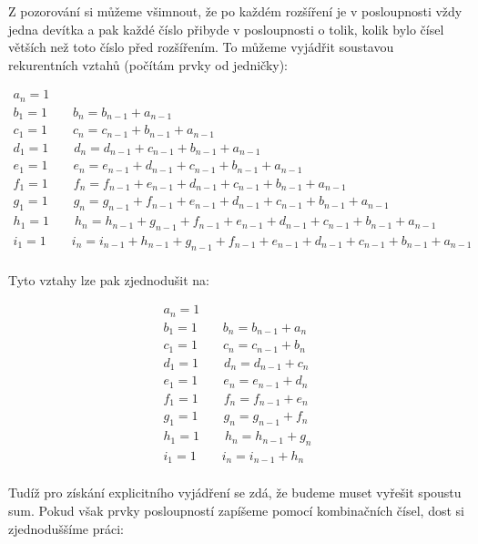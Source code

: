 \documentclass{fkssolpub}
\author{Ondřej Sedláček}
\begin{document}
 

Z pozorování si můžeme všimnout, že po každém rozšíření je v posloupnosti
vždy jedna devítka a pak každé číslo přibyde v posloupnosti o tolik,
kolik bylo čísel větších než toto číslo před rozšířením. To můžeme
vyjádřit soustavou rekurentních vztahů (počítám prvky od jedničky):

\begin{gather*}
  a_n = 1 \\
  b_1 = 1 \qquad b_n = b_{n - 1} + a_{n - 1} \\
  c_1 = 1 \qquad c_n = c_{n - 1} + b_{n - 1} + a_{n - 1} \\
  d_1 = 1 \qquad d_n = d_{n - 1} + c_{n - 1} + b_{n - 1} + a_{n - 1} \\
  e_1 = 1 \qquad e_n = e_{n - 1} + d_{n - 1} + c_{n - 1} + b_{n - 1} + a_{n - 1} \\
  f_1 = 1 \qquad f_n = f_{n - 1} + e_{n - 1} + d_{n - 1} + c_{n - 1} + b_{n - 1} + a_{n - 1} \\
  g_1 = 1 \qquad g_n = g_{n - 1} + f_{n - 1} + e_{n - 1} + d_{n - 1} + c_{n - 1} + b_{n - 1} + a_{n - 1} \\
  h_1 = 1 \qquad h_n = h_{n - 1} + g_{n - 1} + f_{n - 1} + e_{n - 1} + d_{n - 1} + c_{n - 1} + b_{n - 1} + a_{n - 1} \\
  i_1 = 1 \qquad i_n = i_{n - 1} + h_{n - 1} + g_{n - 1} + f_{n - 1} + e_{n - 1} + d_{n - 1} + c_{n - 1} + b_{n - 1} + a_{n - 1} \\
\end{gather*}

Tyto vztahy lze pak zjednodušit na:

\begin{gather*}
  a_n = 1 \\
  b_1 = 1 \qquad b_n = b_{n - 1} + a_{n} \\
  c_1 = 1 \qquad c_n = c_{n - 1} + b_{n} \\
  d_1 = 1 \qquad d_n = d_{n - 1} + c_{n} \\
  e_1 = 1 \qquad e_n = e_{n - 1} + d_{n} \\
  f_1 = 1 \qquad f_n = f_{n - 1} + e_{n} \\
  g_1 = 1 \qquad g_n = g_{n - 1} + f_{n} \\
  h_1 = 1 \qquad h_n = h_{n - 1} + g_{n} \\
  i_1 = 1 \qquad i_n = i_{n - 1} + h_{n} \\
\end{gather*}

Tudíž pro získání explicitního vyjádření se zdá, že budeme muset vyřešit
spoustu sum. Pokud však prvky posloupností zapíšeme pomocí kombinačních
čísel, dost si zjednoduššíme práci:
\end{document}
